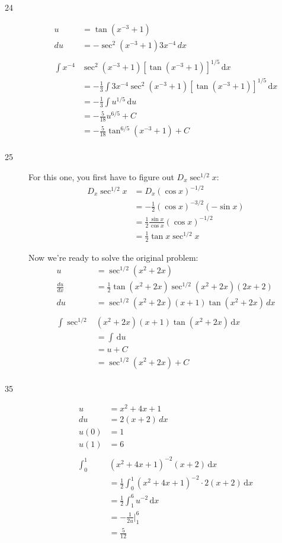 \documentclass{exam}
\begin{document}
\begin{description}
\item[24]
\begin{align*}
  u &= \tan(x^{-3} + 1) \\
  du &= - \sec^2(x^{-3} + 1) 3x^{-4} \, dx \\
\\
  \int x^{-4} &\sec^2(x^{-3} + 1) \left[ \tan(x^{-3} + 1) \right]^{1/5} \, \mathrm{d}x \\
  &= - \frac{1}{3} \int 3x^{-4} \sec^2(x^{-3} + 1) \left[ \tan(x^{-3} + 1) \right]^{1/5} \, \mathrm{d}x \\
  &= - \frac{1}{3} \int u^{1/5} \, \mathrm{d}u \\
  &= - \frac{5}{18} u^{6/5} + C \\
  &= - \frac{5}{18} \tan^{6/5}(x^{-3} + 1) + C \\
\end{align*}

\item[25]
For this one, you first have to figure out $D_x \sec^{1/2} x$:
\begin{align*}
  D_x \sec^{1/2} x &= D_x (\cos x)^{-1/2} \\
  &= - \frac{1}{2} (\cos x)^{-3/2} (- \sin x) \\
  &= \frac{1}{2} \frac{\sin x}{\cos x} (\cos x)^{-1/2} \\
  &= \frac{1}{2} \tan x \sec^{1/2} x
\end{align*}

Now we're ready to solve the original problem:
\begin{align*}
  u &= \sec^{1/2}(x^2 + 2x) \\
  \frac{du}{dx} &= \frac{1}{2} \tan(x^2 + 2x) \sec^{1/2}(x^2 + 2x)(2x + 2) \\
  du &= \sec^{1/2}(x^2 + 2x)(x + 1) \tan(x^2 + 2x) \, dx \\
\\
  \int \sec^{1/2} & (x^2 + 2x)(x + 1) \tan(x^2 + 2x) \, \mathrm{d}x \\
  &= \int \, \mathrm{d}u \\
  &= u + C \\
  &= \sec^{1/2}(x^2 + 2x) + C \\
\end{align*}

\item[35]
\begin{align*}
  u &= x^2 + 4x + 1 \\
  du &= 2 (x + 2) \, dx \\
  u(0) &= 1 \\
  u(1) &= 6 \\
\\
  \int_0^1 & (x^2 + 4x + 1)^{-2} (x + 2) \, \mathrm{d}x \\
  &= \frac{1}{2} \int_0^1 (x^2 + 4x + 1)^{-2} \cdot 2 (x + 2) \, \mathrm{d}x \\
  &= \frac{1}{2} \int_1^6 u^{-2} \, \mathrm{d}x \\
  &= -\frac{1}{2u} \bigg|_1^6 \\
  &= \frac{5}{12} \\
\end{align*}


\end{description}
\end{document}
